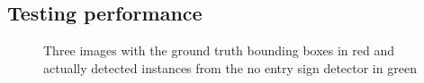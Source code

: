 \documentclass[twocolumn, 10pt, a4paper]{article}
\begin{document}
\subsection{Testing performance}

\begin{figure}[htbp]
  \centering
  \hfill
  \hfill
  \caption{Three images with the ground truth bounding boxes in red and actually detected instances from the no entry sign detector in green}\label{fig:task_2}
\end{figure}
\end{document}
